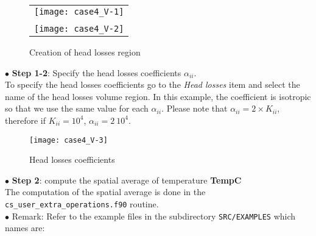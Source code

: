 \begin{figure}[h!]
\begin{center}
\begin{tabular}{c}
\texttt{[image: case4\_V-1]} \\
\\
\texttt{[image: case4\_V-2]}
\end{tabular}
\caption{Creation of head losses region}
\label{fig_hl1}
\end{center}
\end{figure}

\newpage
$\bullet$ \textbf{Step 1-2}:  Specify the head losses coefficients $\alpha_{ii}$.\\
To specify the head losses coefficients go to the {\itshape Head losses} item
and select the name of the head losses volume region.
In this example, the coefficient is isotropic so that we use the same value
for each $\alpha_{ii}$. Please note that $\alpha_{ii}=2 \times K_{ii}$, therefore if
$K_{ii}=10^4$, $\alpha_{ii}=2 \ 10^4$.

\begin{figure}[h!]
\begin{center}
\texttt{[image: case4\_V-3]}
\caption{Head losses coefficients}
\label{fig_hl2}
\end{center}
\end{figure}

$\bullet$ \textbf{Step 2}:  compute the spatial average of temperature \textbf{TempC}\\
The computation of the spatial average is done in the \texttt{cs\_user\_extra\_operations.f90}
routine.\\

$\bullet$ Remark: Refer to the example files in the subdirectory \texttt{SRC/EXAMPLES} which names are:\\

